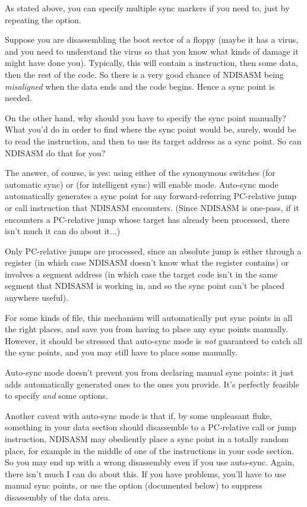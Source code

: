 As stated above, you can specify multiple sync markers if you need
to, just by repeating the  option.



Suppose you are disassembling the boot sector of a  floppy (maybe
it has a virus, and you need to understand the virus so that you
know what kinds of damage it might have done you). Typically, this
will contain a  instruction, then some data, then the rest of the
code. So there is a very good chance of NDISASM being \emph{misaligned}
when the data ends and the code begins. Hence a sync point is
needed.

On the other hand, why should you have to specify the sync point
manually? What you'd do in order to find where the sync point would
be, surely, would be to read the  instruction, and then to use
its target address as a sync point. So can NDISASM do that for you?

The answer, of course, is yes: using either of the synonymous
switches  (for automatic sync) or 
(for intelligent sync) will enable  mode. Auto-sync
mode automatically generates a sync point for any forward-referring
PC-relative jump or call instruction that NDISASM encounters. (Since
NDISASM is one-pass, if it encounters a PC-relative jump whose target
has already been processed, there isn't much it can do about it...)

Only PC-relative jumps are processed, since an absolute jump is
either through a register (in which case NDISASM doesn't know what
the register contains) or involves a segment address (in which case
the target code isn't in the same segment that NDISASM is working
in, and so the sync point can't be placed anywhere useful).

For some kinds of file, this mechanism will automatically put sync
points in all the right places, and save you from having to place
any sync points manually. However, it should be stressed that
auto-sync mode is \emph{not} guaranteed to catch all the sync points, and
you may still have to place some manually.

Auto-sync mode doesn't prevent you from declaring manual sync
points: it just adds automatically generated ones to the ones you
provide. It's perfectly feasible to specify  \emph{and}
some  options.

Another caveat with auto-sync mode is that if, by some unpleasant
fluke, something in your data section should disassemble to a
PC-relative call or jump instruction, NDISASM may obediently place a
sync point in a totally random place, for example in the middle of
one of the instructions in your code section. So you may end up with
a wrong disassembly even if you use auto-sync. Again, there isn't
much I can do about this. If you have problems, you'll have to use
manual sync points, or use the  option (documented below) to
suppress disassembly of the data area.

